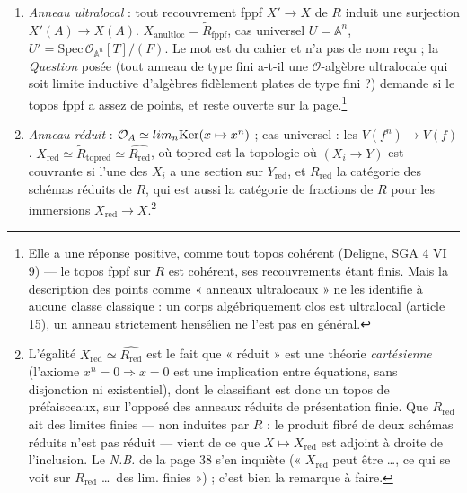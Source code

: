 \documentclass[11pt,a4paper]{article}
\begin{document}
\begin{enumerate}
\item[5)] \emph{Anneau ultralocal} : tout recouvrement fppf $X' \to X$ de
$R$ induit une surjection $X'(A) \to X(A)$. $X_{\mathrm{anultloc}} =
\widetilde{R}_{\mathrm{fppf}}$, cas universel $U = \mathbb{A}^{n}$, $U' =
\mathrm{Spec}\,\mathcal{O}_{\mathbb{A}^{n}}[T]/(F)$. Le mot est du cahier
et n'a pas de nom reçu ; la \emph{Question} posée (tout anneau de type
fini a-t-il une $\mathcal{O}$-algèbre ultralocale qui soit limite
inductive d'algèbres fidèlement plates de type fini ?) demande si le topos
fppf a assez de points, et reste ouverte sur la page.\footnote{Elle a une
réponse positive, comme tout topos cohérent (Deligne, SGA 4 VI 9) — le
topos fppf sur $R$ est cohérent, ses recouvrements étant finis. Mais la
description des points comme « anneaux ultralocaux » ne les identifie à
aucune classe classique : un corps algébriquement clos est ultralocal
(article 15), un anneau strictement hensélien ne l'est pas en général.}

\item[6)] \emph{Anneau réduit} : $\mathcal{O}_{A} \simeq \varinjlim_{n}
\mathrm{Ker}(x \mapsto x^{n})$ ; cas universel : les $V(f^{n}) \to V(f)$.
$X_{\mathrm{red}} \simeq \widetilde{R}_{\mathrm{topred}} \simeq
\widehat{R_{\mathrm{red}}}$, où topred est la topologie où $(X_{i} \to Y)$
est couvrante si l'une des $X_{i}$ a une section sur $Y_{\mathrm{red}}$, et
$R_{\mathrm{red}}$ la catégorie des schémas réduits de $R$, qui est aussi
la catégorie de fractions de $R$ pour les immersions $X_{\mathrm{red}} \to
X$.\footnote{L'égalité $X_{\mathrm{red}} \simeq \widehat{R_{\mathrm{red}}}$
est le fait que « réduit » est une théorie \emph{cartésienne} (l'axiome
$x^{n} = 0 \Rightarrow x = 0$ est une implication entre équations, sans
disjonction ni existentiel), dont le classifiant est donc un topos de
préfaisceaux, sur l'opposé des anneaux réduits de présentation finie. Que
$R_{\mathrm{red}}$ ait des limites finies — non induites par $R$ : le
produit fibré de deux schémas réduits n'est pas réduit — vient de ce que
$X \mapsto X_{\mathrm{red}}$ est adjoint à droite de l'inclusion. Le
\emph{N.B.} de la page 38 s'en inquiète (« $X_{\mathrm{red}}$ peut être
\ldots, ce qui se voit sur $R_{\mathrm{red}}$ \ldots\ des lim. finies ») ;
c'est bien la remarque à faire.}


\end{enumerate}
\end{document}
